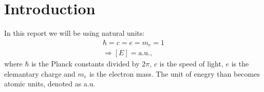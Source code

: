 \section{Introduction}



In this report we will be using natural units:
\begin{align*}
\hbar = c = e = m_e = 1\\
\Rightarrow [E] = \mathrm{a.u.},
\end{align*}
where $\hbar$ is the Planck constants divided by $2\pi$, $c$ is the speed of light, $e$ is the elemantary charge and $m_e$ is the electron mass. The unit of enegry than becomes atomic units, denoted as a.u.